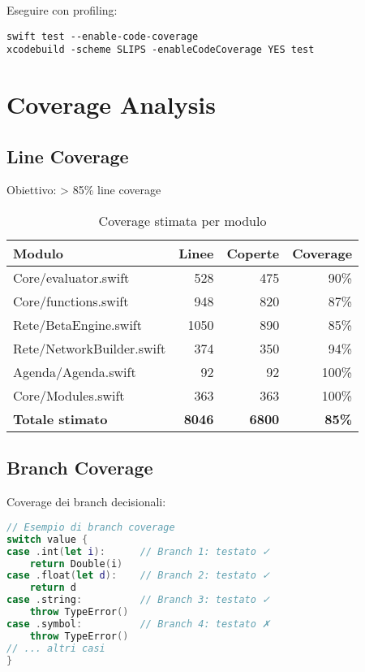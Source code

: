 \begin{infobox}[Strumentazione]
Eseguire con profiling:
\begin{verbatim}
swift test --enable-code-coverage
xcodebuild -scheme SLIPS -enableCodeCoverage YES test
\end{verbatim}
\end{infobox}

\section{Coverage Analysis}

\subsection{Line Coverage}

Obiettivo: > 85\% line coverage

\begin{table}[h]
\centering
\begin{tabular}{@{}lrrr@{}}
\toprule
\textbf{Modulo} & \textbf{Linee} & \textbf{Coperte} & \textbf{Coverage} \\
\midrule
Core/evaluator.swift & 528 & 475 & 90\% \\
Core/functions.swift & 948 & 820 & 87\% \\
Rete/BetaEngine.swift & 1050 & 890 & 85\% \\
Rete/NetworkBuilder.swift & 374 & 350 & 94\% \\
Agenda/Agenda.swift & 92 & 92 & 100\% \\
Core/Modules.swift & 363 & 363 & 100\% \\
\midrule
\textbf{Totale stimato} & \textbf{8046} & \textbf{~6800} & \textbf{~85\%} \\
\bottomrule
\end{tabular}
\caption{Coverage stimata per modulo}
\label{tab:coverage}
\end{table}

\subsection{Branch Coverage}

Coverage dei branch decisionali:

\begin{lstlisting}[language=Swift]
// Esempio di branch coverage
switch value {
case .int(let i):      // Branch 1: testato ✓
    return Double(i)
case .float(let d):    // Branch 2: testato ✓
    return d
case .string:          // Branch 3: testato ✓
    throw TypeError()
case .symbol:          // Branch 4: testato ✗
    throw TypeError()
// ... altri casi
}
\end{lstlisting}

